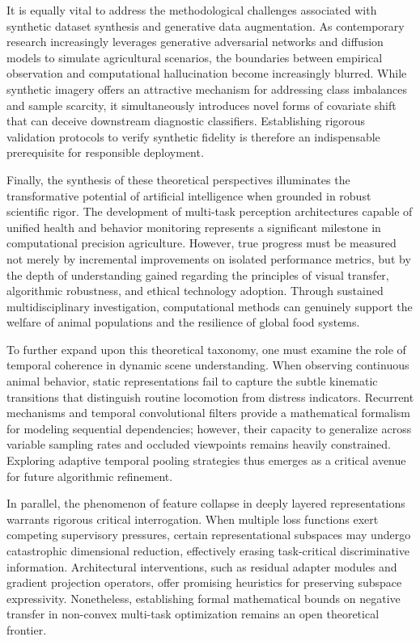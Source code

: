 \documentclass[Times,12pt,oneside,openany,print,index]{report}
\begin{document}
It is equally vital to address the methodological challenges associated with synthetic dataset synthesis and generative data augmentation. As contemporary research increasingly leverages generative adversarial networks and diffusion models to simulate agricultural scenarios, the boundaries between empirical observation and computational hallucination become increasingly blurred. While synthetic imagery offers an attractive mechanism for addressing class imbalances and sample scarcity, it simultaneously introduces novel forms of covariate shift that can deceive downstream diagnostic classifiers. Establishing rigorous validation protocols to verify synthetic fidelity is therefore an indispensable prerequisite for responsible deployment.

Finally, the synthesis of these theoretical perspectives illuminates the transformative potential of artificial intelligence when grounded in robust scientific rigor. The development of multi-task perception architectures capable of unified health and behavior monitoring represents a significant milestone in computational precision agriculture. However, true progress must be measured not merely by incremental improvements on isolated performance metrics, but by the depth of understanding gained regarding the principles of visual transfer, algorithmic robustness, and ethical technology adoption. Through sustained multidisciplinary investigation, computational methods can genuinely support the welfare of animal populations and the resilience of global food systems.

To further expand upon this theoretical taxonomy, one must examine the role of temporal coherence in dynamic scene understanding. When observing continuous animal behavior, static representations fail to capture the subtle kinematic transitions that distinguish routine locomotion from distress indicators. Recurrent mechanisms and temporal convolutional filters provide a mathematical formalism for modeling sequential dependencies; however, their capacity to generalize across variable sampling rates and occluded viewpoints remains heavily constrained. Exploring adaptive temporal pooling strategies thus emerges as a critical avenue for future algorithmic refinement.

In parallel, the phenomenon of feature collapse in deeply layered representations warrants rigorous critical interrogation. When multiple loss functions exert competing supervisory pressures, certain representational subspaces may undergo catastrophic dimensional reduction, effectively erasing task-critical discriminative information. Architectural interventions, such as residual adapter modules and gradient projection operators, offer promising heuristics for preserving subspace expressivity. Nonetheless, establishing formal mathematical bounds on negative transfer in non-convex multi-task optimization remains an open theoretical frontier.
\end{document}
